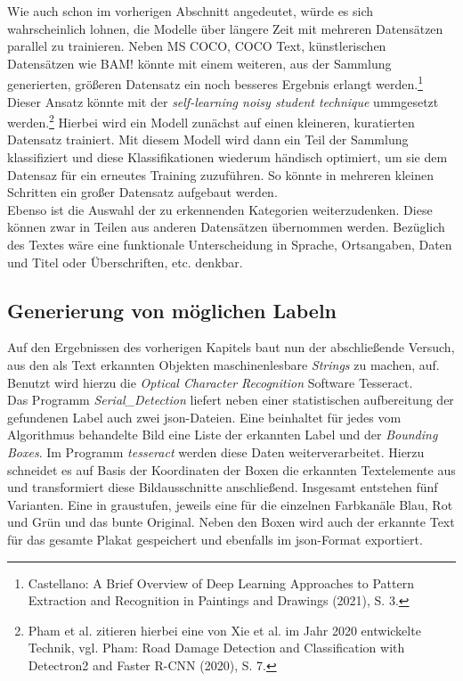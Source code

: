 \documentclass[a4paper,12pt,ngerman]{article}
\begin{document}
Wie auch schon im vorherigen Abschnitt angedeutet, würde es sich wahrscheinlich lohnen, die Modelle über längere Zeit mit mehreren Datensätzen parallel zu trainieren. Neben MS COCO, COCO Text, künstlerischen Datensätzen wie BAM! könnte mit einem weiteren, aus der Sammlung generierten, größeren Datensatz ein noch besseres Ergebnis erlangt werden.\footnote{Castellano: A Brief Overview of Deep Learning Approaches to Pattern Extraction and Recognition in Paintings and Drawings (2021), S. 3.} \\
Dieser Ansatz könnte mit der \textit{self-learning noisy student technique} ummgesetzt werden.\footnote{Pham et al. zitieren hierbei eine von Xie et al. im Jahr 2020 entwickelte Technik, vgl. Pham: Road Damage Detection and Classification with Detectron2 and Faster R-CNN (2020), S. 7.} Hierbei wird ein Modell zunächst auf einen kleineren, kuratierten Datensatz trainiert. Mit diesem Modell wird dann ein Teil der Sammlung klassifiziert und diese Klassifikationen wiederum händisch optimiert, um sie dem Datensaz für ein erneutes Training zuzuführen. So könnte in mehreren kleinen Schritten ein großer Datensatz aufgebaut werden. \\
Ebenso ist die Auswahl der zu erkennenden Kategorien weiterzudenken. Diese können zwar in Teilen aus anderen Datensätzen übernommen werden. Bezüglich des Textes wäre eine funktionale Unterscheidung in Sprache, Ortsangaben, Daten und Titel oder Überschriften, etc. denkbar.

\subsection{Generierung von möglichen Labeln}

Auf den Ergebnissen des vorherigen Kapitels baut nun der abschließende Versuch, aus den als Text erkannten Objekten maschinenlesbare \textit{Strings} zu machen, auf. Benutzt wird hierzu die \textit{Optical Character Recognition} Software Tesseract. \\

Das Programm \textit{Serial\_Detection} liefert neben einer statistischen aufbereitung der gefundenen Label auch zwei json-Dateien. Eine beinhaltet für jedes vom Algorithmus behandelte Bild eine Liste der erkannten Label und der \textit{Bounding Boxes}. Im Programm \textit{tesseract} werden diese Daten weiterverarbeitet. Hierzu schneidet es auf Basis der Koordinaten der Boxen die erkannten Textelemente aus und transformiert diese Bildausschnitte anschließend. Insgesamt entstehen fünf Varianten. Eine in graustufen, jeweils eine für die einzelnen Farbkanäle Blau, Rot und Grün und das bunte Original. Neben den Boxen wird auch der erkannte Text für das gesamte Plakat gespeichert und ebenfalls im json-Format exportiert.
\end{document}
